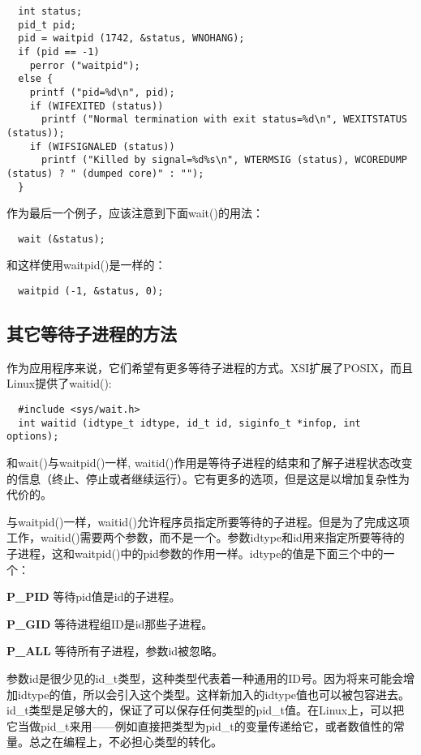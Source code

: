 \begin{lstlisting}
  int status;
  pid_t pid;
  pid = waitpid (1742, &status, WNOHANG);
  if (pid == -1)
    perror ("waitpid");
  else {
    printf ("pid=%d\n", pid);
    if (WIFEXITED (status))
      printf ("Normal termination with exit status=%d\n", WEXITSTATUS (status));
    if (WIFSIGNALED (status))
      printf ("Killed by signal=%d%s\n", WTERMSIG (status), WCOREDUMP (status) ? " (dumped core)" : "");
  }
\end{lstlisting}

作为最后一个例子，应该注意到下面wait()的用法：

\begin{lstlisting}
  wait (&status);
\end{lstlisting}

和这样使用waitpid()是一样的：

\begin{lstlisting}
  waitpid (-1, &status, 0);
\end{lstlisting}

\subsection{其它等待子进程的方法}

作为应用程序来说，它们希望有更多等待子进程的方式。XSI扩展了POSIX，而且Linux提供了waitid():

\begin{lstlisting}
  #include <sys/wait.h>
  int waitid (idtype_t idtype, id_t id, siginfo_t *infop, int options);
\end{lstlisting}

和wait()与waitpid()一样, waitid()作用是等待子进程的结束和了解子进程状态改变的信息（终止、停止或者继续运行）。它有更多的选项，但是这是以增加复杂性为代价的。

与waitpid()一样，waitid()允许程序员指定所要等待的子进程。但是为了完成这项工作，waitid()需要两个参数，而不是一个。参数idtype和id用来指定所要等待的子进程，这和waitpid()中的pid参数的作用一样。idtype的值是下面三个中的一个：

\begin{eqlist*}
\item[\textbf{P\_PID}] 等待pid值是id的子进程。
\item[\textbf{P\_GID}] 等待进程组ID是id那些子进程。
\item[\textbf{P\_ALL}] 等待所有子进程，参数id被忽略。
\end{eqlist*}

参数id是很少见的id\_t类型，这种类型代表着一种通用的ID号。因为将来可能会增加idtype的值，所以会引入这个类型。这样新加入的idtype值也可以被包容进去。id\_t类型是足够大的，保证了可以保存任何类型的pid\_t值。在Linux上，可以把它当做pid\_t来用——例如直接把类型为pid\_t的变量传递给它，或者数值性的常量。总之在编程上，不必担心类型的转化。

